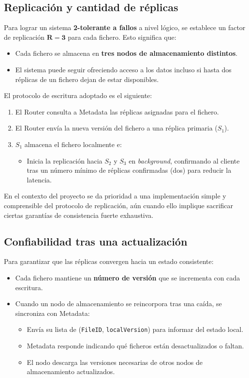 \documentclass{article}
\begin{document}
\subsection{Replicación y cantidad de réplicas}
Para lograr un sistema \textbf{2-tolerante a fallos} a nivel lógico, se establece un factor de replicación $\mathbf{R = 3}$ para cada fichero. Esto significa que:
\begin{itemize}
    \item Cada fichero se almacena en \textbf{tres nodos de almacenamiento distintos}.
    \item El sistema puede seguir ofreciendo acceso a los datos incluso si hasta dos réplicas de un fichero dejan de estar disponibles.
\end{itemize}

El protocolo de escritura adoptado es el siguiente:
\begin{enumerate}
    \item El Router consulta a Metadata las réplicas asignadas para el fichero.
    \item El Router envía la nueva versión del fichero a una réplica primaria ($S_1$).
    \item $S_1$ almacena el fichero localmente e:
    \begin{itemize}
        \item Inicia la replicación hacia $S_2$ y $S_3$ en \emph{background}, confirmando al cliente tras un número mínimo de réplicas confirmadas (dos) para reducir la latencia.
    \end{itemize}
\end{enumerate}
En el contexto del proyecto se da prioridad a una implementación simple y comprensible del protocolo de replicación, aún cuando ello implique sacrificar ciertas garantías de consistencia fuerte exhaustiva.

\subsection{Confiabilidad tras una actualización}
Para garantizar que las réplicas convergen hacia un estado consistente:
\begin{itemize}
    \item Cada fichero mantiene un \textbf{número de versión} que se incrementa con cada escritura.
    \item Cuando un nodo de almacenamiento se reincorpora tras una caída, se sincroniza con Metadata:
    \begin{itemize}
        \item Envía su lista de (\texttt{FileID}, \texttt{localVersion}) para informar del estado local.
        \item Metadata responde indicando qué ficheros están desactualizados o faltan.
        \item El nodo descarga las versiones necesarias de otros nodos de almacenamiento actualizados.
    \end{itemize}
\end{itemize}
\end{document}
